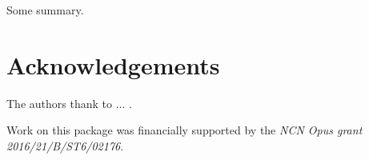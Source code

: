 Some summary. 
\section{Acknowledgements}

The authors thank to ... .

Work on this package was financially supported by the \emph{NCN Opus grant 2016/21/B/ST6/02176}.




\address{Agnieszka Sitko \\
  University of Warsaw\\
  Faculty of Mathematics, 
  Informatics and Mechanics\\
  Poland \\
  }

\address{Przemysław Biecek \\
  University of Warsaw \\
  Institute of Applied Mathematics and Mechanics\\
  Poland\\
  }
